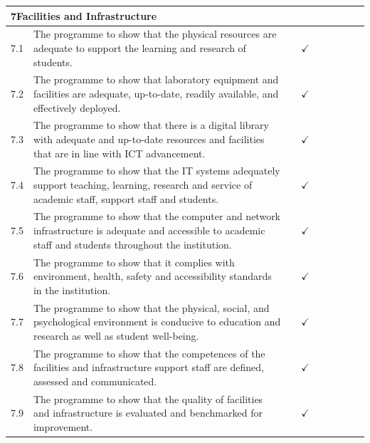 \begin{longtable}{|p{0.6cm}|>{\raggedright\arraybackslash}p{9.2cm}|c|c|c|c|c|c|c|}
  \multicolumn{9}{|l|}{\cellcolor{gray!15}\textbf{7\quad Facilities and Infrastructure}} \\
  \hline
  7.1 & The programme to show that the physical resources are adequate to support the learning and research of students. & & $\checkmark$ & & & & & \\
  \hline
  7.2 & The programme to show that laboratory equipment and facilities are adequate, up-to-date, readily available, and effectively deployed. & & $\checkmark$ & & & & & \\
  \hline
  7.3 & The programme to show that there is a digital library with adequate and up-to-date resources and facilities that are in line with ICT advancement. & & $\checkmark$ & & & & & \\
  \hline
  7.4 & The programme to show that the IT systems adequately support teaching, learning, research and service of academic staff, support staff and students. & & $\checkmark$ & & & & & \\
  \hline
  7.5 & The programme to show that the computer and network infrastructure is adequate and accessible to academic staff and students throughout the institution. & & $\checkmark$ & & & & & \\
  \hline
  7.6 & The programme to show that it complies with environment, health, safety and accessibility standards in the institution. & & $\checkmark$ & & & & & \\
  \hline
  7.7 & The programme to show that the physical, social, and psychological environment is conducive to education and research as well as student well-being. & & $\checkmark$ & & & & & \\
  \hline
  7.8 & The programme to show that the competences of the facilities and infrastructure support staff are defined, assessed and communicated. & & $\checkmark$ & & & & & \\
  \hline
  7.9 & The programme to show that the quality of facilities and infrastructure is evaluated and benchmarked for improvement. & & $\checkmark$ & & & & & \\
  \hline


\end{longtable}
